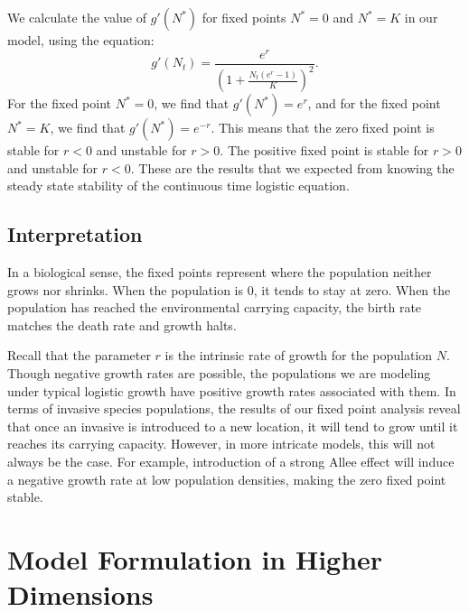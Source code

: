 \documentclass[12pt, openany]{book}
\theoremstyle{definition}
\theoremstyle{remark}
\numberwithin{equation}{chapter}
\numberwithin{figure}{chapter}
\begin{document}
We calculate the value of $g'(N^*)$ for fixed points $N^* = 0$ and $N^* = K$ in our model, using the equation: 
\begin{equation}\label{15}
g'(N_t) = \frac{e^r}{\left(1+\frac{N_t(e^r-1)}{K}\right)^2}.
\end{equation}
For the fixed point $N^* = 0$, we find that $g'(N^*) = e^r$, and for the fixed point $N^* = K$, we find that $g'(N^*) = e^{-r}$. This means that the zero fixed point is stable for $r < 0$ and unstable for $r > 0$. The positive fixed point is stable for $r > 0$ and unstable for $r < 0$. These are the results that we expected from knowing the steady state stability of the continuous time logistic equation.

\subsection{Interpretation}

In a biological sense, the fixed points represent where the population neither grows nor shrinks. When the population is $0$, it tends to stay at zero. When the population has reached the environmental carrying capacity, the birth rate matches the death rate and growth halts. 

Recall that the parameter $r$ is the intrinsic rate of growth for the population $N$. Though negative growth rates are possible, the populations we are modeling under typical logistic growth have positive growth rates associated with them. In terms of invasive species populations, the results of our fixed point analysis reveal that once an invasive is introduced to a new location, it will tend to grow until it reaches its carrying capacity. However, in more intricate models, this will not always be the case. For example, introduction of a strong Allee effect will induce a negative growth rate at low population densities, making the zero fixed point stable. 

\section{Model Formulation in Higher Dimensions}
\end{document}
